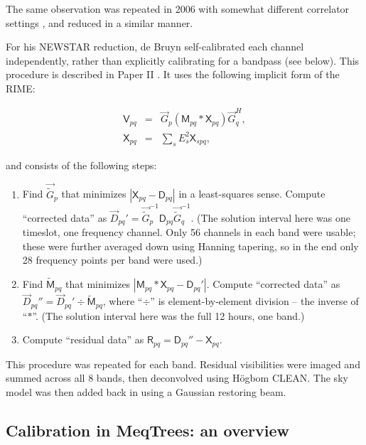 \documentclass{aa}
\newcommand{\herm}{H}
\newcommand{\jones}[2]{\vec {#1}_{#2}}
\newcommand{\jonesinv}[2]{\vec {#1}^{-1}_{#2}}
\newcommand{\jonesT}[2]{\vec {#1}^{\herm}_{#2}}
\newcommand{\coh}[2]{\mathsf{{#1}}_{{#2}}}
\begin{document}
The same observation was repeated in 2006 with somewhat different correlator settings \citep[for details, see]{deBruyn:3c147}, and reduced in a similar manner.

For his NEWSTAR reduction, de Bruyn self-calibrated each channel independently, rather than explicitly calibrating for a bandpass (see below). This procedure is described in Paper II \citep[Sect.~1.1]{RRIME2}. It uses the following implicit form of the RIME:

\begin{eqnarray}\label{eq:newstar-rime}
\coh{V}{pq} & = & \jones{G}{p} \left ( \coh{M}{pq} \ast \coh{X}{pq} \right ) \jonesT{G}{q}, \\
\nonumber \coh{X}{pq} & = & \sum_{s} E^2_s \coh{X}{spq},
\end{eqnarray}

and consists of the following steps:

\begin{enumerate}
\item Find $\jones{\tilde{G}}{p}$ that minimizes $|\coh{X}{pq} - \coh{D}{pq}|$ in a least-squares sense. Compute ``corrected data'' as $\jones{D}{pq}' = \jonesinv{\tilde{G}}{p} \coh{D}{pq} \jonesinv{\tilde{G}}{q}.$ (The solution interval here was one timeslot, one frequency channel. Only 56 channels in each band were usable; these were further averaged down using Hanning tapering, so in the end only 28 frequency points per band were used.)

\item Find $\coh{\tilde{M}}{pq}$ that minimizes $|\coh{M}{pq} \ast \coh{X}{pq} - \coh{D}{pq}'|$.
Compute ``corrected data'' as $\jones{D}{pq}'' = \jones{D}{pq}' \div \coh{\tilde{M}}{pq}$, where ``$\div$'' is element-by-element division -- the inverse of ``$\ast$''. (The solution interval here was the full 12 hours, one band.)

\item Compute ``residual data'' as $\coh{R}{pq} = \coh{D}{pq}'' - \coh{X}{pq}$. 
\end{enumerate}

This procedure was repeated for each band. Residual visibilities were imaged and summed across all 8 bands, then  deconvolved using H\"ogbom CLEAN. The sky model was then added back in using a Gaussian restoring beam.

\subsection{Calibration in MeqTrees: an overview}
\end{document}
